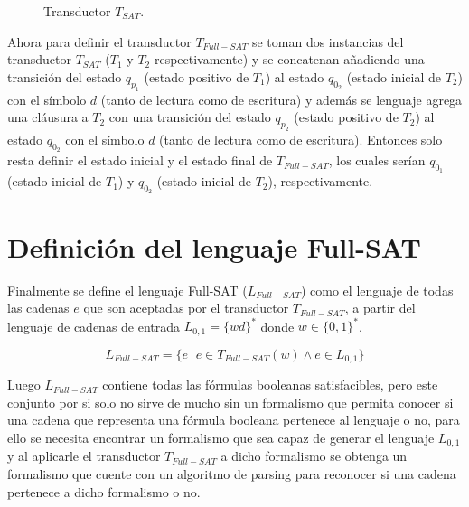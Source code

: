 \documentclass{book}
\begin{document}
\begin{figure}[h]
    \centering        {}
    \caption{Transductor $T_{SAT}$.}
    \label{fig:transducer} %
\end{figure}

Ahora para definir el transductor $T_{Full-SAT}$ se toman dos instancias del transductor $T_{SAT}$ ($T_1$ y $T_2$ respectivamente) y se concatenan
añadiendo una transición del estado $q_{p_1}$ (estado positivo de $T_1$) al estado $q_{0_2}$ (estado inicial de $T_2$) con el símbolo $d$ (tanto de
lectura como de escritura) y además se lenguaje agrega una cláusura a $T_2$ con una transición del estado $q_{p_2}$
(estado positivo de $T_2$) al estado $q_{0_2}$ con el símbolo $d$ (tanto de lectura como de escritura). Entonces solo resta definir
el estado inicial y el estado final de $T_{Full-SAT}$, los cuales serían $q_{0_1}$ (estado inicial de $T_1$) y $q_{0_2}$ (estado inicial de $T_2$),
respectivamente.

\section{Definición del lenguaje Full-SAT}

Finalmente se define el lenguaje Full-SAT (\textit{$L_{Full-SAT}$}) como el lenguaje de todas las cadenas $e$ que son aceptadas por el transductor $T_{Full-SAT}$, a partir del lenguaje
de cadenas de entrada $L_{0,1}=\{wd\}^*$ donde $w\in \{0,1\}^*$. 

$$L_{Full-SAT} = \{e\,|\,e \in T_{Full-SAT}(w) \wedge e \in L_{0,1}\}$$

Luego $L_{Full-SAT}$ contiene todas las fórmulas booleanas satisfacibles, pero este conjunto por si solo no sirve de mucho sin un formalismo
que permita conocer si una cadena que representa una fórmula booleana pertenece al lenguaje o no, para ello se necesita encontrar un formalismo que sea capaz
de generar el lenguaje $L_{0,1}$ y al aplicarle el transductor $T_{Full-SAT}$ a dicho formalismo se obtenga un formalismo que cuente con un algoritmo de parsing
para reconocer si una cadena pertenece a dicho formalismo o no.
\end{document}
